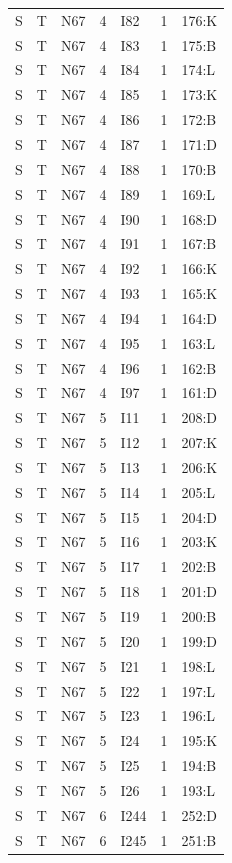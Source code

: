 {\begin{longtable}{lllrlrp{.35\linewidth}}
S & T & N67 & 4 & I82 & 1 & 176:K \\
S & T & N67 & 4 & I83 & 1 & 175:B \\
S & T & N67 & 4 & I84 & 1 & 174:L \\
S & T & N67 & 4 & I85 & 1 & 173:K \\
S & T & N67 & 4 & I86 & 1 & 172:B \\
S & T & N67 & 4 & I87 & 1 & 171:D \\
S & T & N67 & 4 & I88 & 1 & 170:B \\
S & T & N67 & 4 & I89 & 1 & 169:L \\
S & T & N67 & 4 & I90 & 1 & 168:D \\
S & T & N67 & 4 & I91 & 1 & 167:B \\
S & T & N67 & 4 & I92 & 1 & 166:K \\
S & T & N67 & 4 & I93 & 1 & 165:K \\
S & T & N67 & 4 & I94 & 1 & 164:D \\
S & T & N67 & 4 & I95 & 1 & 163:L \\
S & T & N67 & 4 & I96 & 1 & 162:B \\
S & T & N67 & 4 & I97 & 1 & 161:D \\
S & T & N67 & 5 & I11 & 1 & 208:D \\
S & T & N67 & 5 & I12 & 1 & 207:K \\
S & T & N67 & 5 & I13 & 1 & 206:K \\
S & T & N67 & 5 & I14 & 1 & 205:L \\
S & T & N67 & 5 & I15 & 1 & 204:D \\
S & T & N67 & 5 & I16 & 1 & 203:K \\
S & T & N67 & 5 & I17 & 1 & 202:B \\
S & T & N67 & 5 & I18 & 1 & 201:D \\
S & T & N67 & 5 & I19 & 1 & 200:B \\
S & T & N67 & 5 & I20 & 1 & 199:D \\
S & T & N67 & 5 & I21 & 1 & 198:L \\
S & T & N67 & 5 & I22 & 1 & 197:L \\
S & T & N67 & 5 & I23 & 1 & 196:L \\
S & T & N67 & 5 & I24 & 1 & 195:K \\
S & T & N67 & 5 & I25 & 1 & 194:B \\
S & T & N67 & 5 & I26 & 1 & 193:L \\
S & T & N67 & 6 & I244 & 1 & 252:D \\
S & T & N67 & 6 & I245 & 1 & 251:B \\

\end{longtable}}
